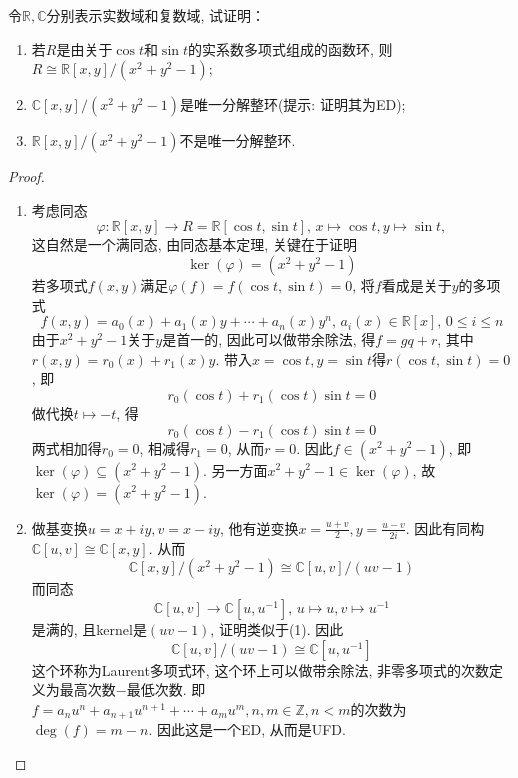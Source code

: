 \begin{problem}\label{ex:2.2.6}
    令$\mathbb{R}, \mathbb{C}$分别表示实数域和复数域, 试证明：
\begin{enumerate}[(1)]
    \item 若$R$是由关于$\cos t$和$\sin t$的实系数多项式组成的函数环, 
则$R \cong \mathbb{R}[x, y]/(x^2 + y^2 - 1)$;
    \item $\mathbb{C}[x, y]/(x^2 + y^2 - 1)$是唯一分解整环(提示: 证明其为ED);
    \item $\mathbb{R}[x, y]/(x^2 + y^2 - 1)$不是唯一分解整环.
\end{enumerate}
\end{problem}

\begin{proof}
\begin{enumerate}[(1)]
    \item 考虑同态
    \[
        \varphi: \mathbb{R}[x, y] \to R = \mathbb{R}[\cos t, \sin t],\, x \mapsto \cos t, y \mapsto \sin t,
    \]
    这自然是一个满同态, 由同态基本定理, 关键在于证明
    \[
        \ker(\varphi) = (x^2 + y^2 - 1)
    \]
    若多项式$f(x, y)$满足$\varphi(f) = f(\cos t, \sin t) = 0$, 将$f$看成是关于$y$的多项式
    \[
        f(x, y) = a_0(x) + a_1(x)y + \cdots + a_n(x)y^n,\, a_i(x) \in \mathbb{R}[x],\, 0 \leqslant i \leqslant n
    \]
    由于$x^2 + y^2 - 1$关于$y$是首一的, 因此可以做带余除法, 得$f = gq + r$, 其中$r(x, y) = r_0(x) + r_1(x)y$. 带入$x = \cos t, y = \sin t$得$r(\cos t, \sin t) = 0$, 即
    \[
        r_0(\cos t) + r_1(\cos t)\sin t = 0
    \]
    做代换$t \mapsto -t$, 得
    \[
        r_0(\cos t) - r_1(\cos t)\sin t = 0
    \]
    两式相加得$r_0 = 0$, 相减得$r_1 = 0$, 从而$r = 0$. 因此$f \in (x^2 + y^2 - 1)$, 即$\ker(\varphi) \subseteq (x^2 + y^2 - 1)$. 另一方面$x^2 + y^2 - 1 \in \ker(\varphi)$, 故$\ker(\varphi) = (x^2 + y^2 - 1)$.
    \item 做基变换$u = x + iy, v = x - iy$, 他有逆变换$x = \frac{u + v}{2}, y = \frac{u - v}{2i}$. 因此有同构$\mathbb{C}[u, v] \cong \mathbb{C}[x, y]$. 从而
    \[
        \mathbb{C}[x, y]/(x^2 + y^2 - 1) \cong \mathbb{C}[u, v]/(uv - 1)
    \]
    而同态
    \[
        \mathbb{C}[u, v] \to \mathbb{C}[u, u^{-1}],\, u \mapsto u, v \mapsto u^{-1}
    \]
    是满的, 且kernel是$(uv - 1)$, 证明类似于(1). 因此
    \[
        \mathbb{C}[u, v]/(uv - 1) \cong \mathbb{C}[u, u^{-1}]
    \]
    这个环称为Laurent多项式环, 这个环上可以做带余除法, 非零多项式的次数定义为最高次数$-$最低次数. 即$f = a_nu^n + a_{n + 1}u^{n + 1} + \cdots + a_mu^m, n, m \in \mathbb{Z}, n < m$的次数为$\deg(f) = m - n$.
    因此这是一个ED, 从而是UFD.

\end{enumerate}
\end{proof}
